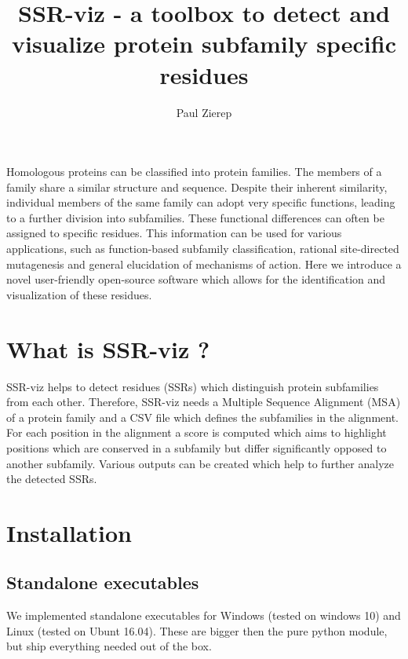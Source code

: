 \documentclass[a4paper,10pt]{article}
\title{SSR-viz - a toolbox to detect and visualize protein
subfamily specific residues}
\author{Paul Zierep}
\begin{document}
\maketitle

\begin{abstract}


\end{abstract}

Homologous proteins can be classified into protein families. The members of a family share a similar structure and sequence. Despite their inherent
similarity, individual members of the same family can adopt very specific functions, leading to a further division into subfamilies. These functional
differences can often be assigned to specific residues. This information can be used for various applications, such as function-based subfamily
classification, rational site-directed mutagenesis and general elucidation of mechanisms of action. Here we introduce a novel user-friendly open-source
software which allows for the identification and visualization of these residues.

\pagebreak
\tableofcontents
\pagebreak

\section{What is SSR-viz ?}

SSR-viz helps to detect residues (SSRs) which distinguish protein subfamilies from each other.
Therefore, SSR-viz needs a Multiple Sequence Alignment (MSA) of a protein family and a CSV file which defines the 
subfamilies in the alignment.
For each position in the alignment a score is computed which aims to highlight positions which are conserved in a 
subfamily but differ significantly opposed to another subfamily. 
Various outputs can be created which help to further analyze the detected SSRs.

\section{Installation}

\subsection{Standalone executables}

We implemented standalone 
executables for Windows (tested on windows 10) and Linux (tested on Ubunt 16.04).
These are bigger then the pure python module, but ship everything needed out of
the box. \\
\end{document}
